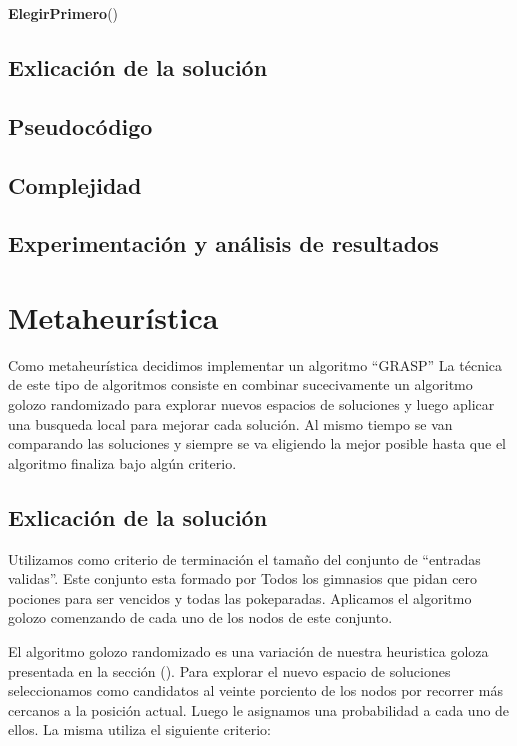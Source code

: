 \documentclass[spanish,12pt]{article}
\begin{document}
\begin{algorithm}[H]{\textbf{ElegirPrimero}()}
\subsection{Exlicación de la solución}

\subsection{Pseudocódigo}

\subsection{Complejidad}

\subsection{Experimentación y análisis de resultados}



\section{Metaheurística}

Como metaheurística decidimos implementar un algoritmo ``GRASP''
La técnica de este tipo de algoritmos consiste en combinar sucecivamente un algoritmo golozo randomizado para explorar nuevos espacios de soluciones y luego aplicar una busqueda local para mejorar cada solución. Al mismo tiempo se van comparando las soluciones y siempre se va eligiendo la mejor posible hasta que el algoritmo finaliza bajo algún criterio.

\subsection{Exlicación de la solución}

Utilizamos como criterio de terminación el tamaño del conjunto de ``entradas validas''. Este conjunto esta formado por Todos los gimnasios que pidan cero pociones para ser vencidos y todas las pokeparadas. Aplicamos el algoritmo golozo comenzando de cada uno de los nodos de este conjunto. 

El algoritmo golozo randomizado es una variación de nuestra heuristica goloza presentada en la sección (). %
Para explorar el nuevo espacio de soluciones seleccionamos como candidatos al veinte porciento de los nodos por recorrer más cercanos a la posición actual.
Luego le asignamos una probabilidad a cada uno de ellos. La misma utiliza el siguiente criterio:


\end{algorithm}
\end{document}
